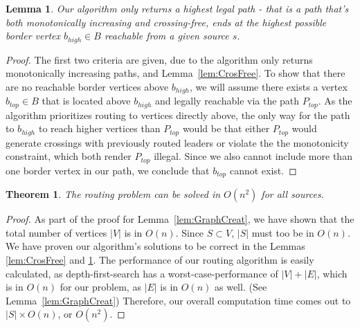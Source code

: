 \documentclass[11pt,a4paper]{vutinfth}
\newtheorem{lemma}{Lemma}
\newtheorem{theorem}{Theorem}
\begin{document}
\begin{lemma}
	Our algorithm only returns a highest legal path - that is a path that's both monotonically increasing and crossing-free, ends at the highest possible border vertex $b_{high} \in B$ reachable from a given source $s$.
	\label{lem:High}
\end{lemma}
\begin{proof}
	The first two criteria are given, due to the algorithm only returns monotonically increasing paths, and Lemma~\ref{lem:CrosFree}. To show that there are no reachable border vertices above $b_{high}$, we will assume there exists a vertex $b_{top} \in B$ that is located above $b_{high}$ and legally reachable via the path $P_{top}$. As the algorithm prioritizes routing to vertices directly above, the only way for the path to $b_{high}$ to reach higher vertices than $P_{top}$ would be that either $P_{top}$ would generate crossings with previously routed leaders or violate the the monotonicity constraint, which both render $P_{top}$ illegal. Since we also cannot include more than one border vertex in our path, we conclude that $b_{top}$ cannot exist.
\end{proof}

\begin{theorem}
	The routing problem  can be solved in $O(n^2)$ for all sources.
\end{theorem}
\begin{proof}
	As part of the proof for Lemma~\ref{lem:GraphCreat}, we have shown that the total number of vertices $|V|$ is in $O(n)$. Since $S \subset V$, $|S|$ must too be in $O(n)$. 
	We have proven our algorithm's solutions to be correct in the Lemmas \ref{lem:CrosFree} and \ref{lem:High}.
	The performance of our routing algorithm is easily calculated, as depth-first-search has a worst-case-performance of $|V|+|E|$, which is in $O(n)$ for our problem, as $|E|$ is in $O(n)$ as well. (See Lemma~\ref{lem:GraphCreat})
	Therefore, our overall computation time comes out to $|S| \times O(n)$, or $O(n^2)$.
\end{proof}
\end{document}
